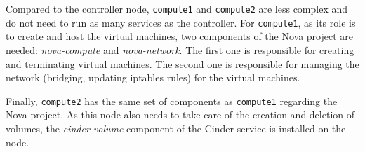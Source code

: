 Compared to the controller node, \texttt{compute1} and \texttt{compute2} are less complex and do not need to run as many services as the controller.
For \texttt{compute1}, as its role is to create and host the virtual machines, two components of the Nova project are needed: \textit{nova-compute} and \textit{nova-network}. The first one is responsible for creating and terminating virtual machines. The second one is responsible for managing the network (bridging, updating iptables rules) for the virtual machines.

Finally, \texttt{compute2} has the same set of components as \texttt{compute1} regarding the Nova project. 
As this node also needs to take care of the creation and deletion of volumes, the \textit{cinder-volume} component of the Cinder service is installed on the node. 


